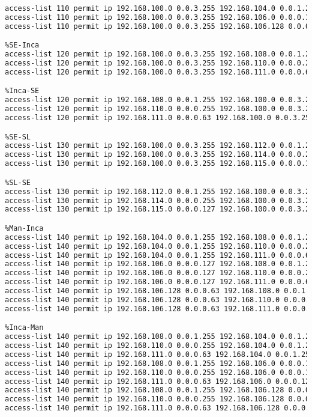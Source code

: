 \begin{lstlisting}[language=Bash, caption={Configuración ACLs Routers Interconexión}]
%R-SonEspases-Man
access-list 110 permit ip 192.168.100.0 0.0.3.255 192.168.104.0 0.0.1.255
access-list 110 permit ip 192.168.100.0 0.0.3.255 192.168.106.0 0.0.0.127
access-list 110 permit ip 192.168.100.0 0.0.3.255 192.168.106.128 0.0.0.63

%SE-Inca
access-list 120 permit ip 192.168.100.0 0.0.3.255 192.168.108.0 0.0.1.255
access-list 120 permit ip 192.168.100.0 0.0.3.255 192.168.110.0 0.0.0.255
access-list 120 permit ip 192.168.100.0 0.0.3.255 192.168.111.0 0.0.0.63

%Inca-SE
access-list 120 permit ip 192.168.108.0 0.0.1.255 192.168.100.0 0.0.3.255 
access-list 120 permit ip 192.168.110.0 0.0.0.255 192.168.100.0 0.0.3.255 
access-list 120 permit ip 192.168.111.0 0.0.0.63 192.168.100.0 0.0.3.255 

%SE-SL
access-list 130 permit ip 192.168.100.0 0.0.3.255 192.168.112.0 0.0.1.255
access-list 130 permit ip 192.168.100.0 0.0.3.255 192.168.114.0 0.0.0.255
access-list 130 permit ip 192.168.100.0 0.0.3.255 192.168.115.0 0.0.0.127

%SL-SE
access-list 130 permit ip 192.168.112.0 0.0.1.255 192.168.100.0 0.0.3.255 
access-list 130 permit ip 192.168.114.0 0.0.0.255 192.168.100.0 0.0.3.255 
access-list 130 permit ip 192.168.115.0 0.0.0.127 192.168.100.0 0.0.3.255 

%Man-Inca
access-list 140 permit ip 192.168.104.0 0.0.1.255 192.168.108.0 0.0.1.255
access-list 140 permit ip 192.168.104.0 0.0.1.255 192.168.110.0 0.0.0.255
access-list 140 permit ip 192.168.104.0 0.0.1.255 192.168.111.0 0.0.0.63
access-list 140 permit ip 192.168.106.0 0.0.0.127 192.168.108.0 0.0.1.255
access-list 140 permit ip 192.168.106.0 0.0.0.127 192.168.110.0 0.0.0.255
access-list 140 permit ip 192.168.106.0 0.0.0.127 192.168.111.0 0.0.0.63
access-list 140 permit ip 192.168.106.128 0.0.0.63 192.168.108.0 0.0.1.255
access-list 140 permit ip 192.168.106.128 0.0.0.63 192.168.110.0 0.0.0.255
access-list 140 permit ip 192.168.106.128 0.0.0.63 192.168.111.0 0.0.0.63

%Inca-Man
access-list 140 permit ip 192.168.108.0 0.0.1.255 192.168.104.0 0.0.1.255 
access-list 140 permit ip 192.168.110.0 0.0.0.255 192.168.104.0 0.0.1.255 
access-list 140 permit ip 192.168.111.0 0.0.0.63 192.168.104.0 0.0.1.255 
access-list 140 permit ip 192.168.108.0 0.0.1.255 192.168.106.0 0.0.0.127 
access-list 140 permit ip 192.168.110.0 0.0.0.255 192.168.106.0 0.0.0.127 
access-list 140 permit ip 192.168.111.0 0.0.0.63 192.168.106.0 0.0.0.127 
access-list 140 permit ip 192.168.108.0 0.0.1.255 192.168.106.128 0.0.0.63 
access-list 140 permit ip 192.168.110.0 0.0.0.255 192.168.106.128 0.0.0.63 
access-list 140 permit ip 192.168.111.0 0.0.0.63 192.168.106.128 0.0.0.63 


\end{lstlisting}
